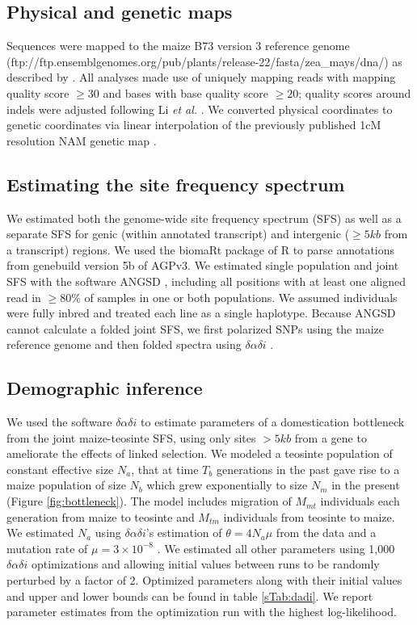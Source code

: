\documentclass{pnastwo}
\begin{document}
\begin{article}
\begin{materials}
\subsection{Physical and genetic maps}
Sequences were mapped to the maize B73 version 3 reference genome \cite{schnable2009} (ftp://ftp.ensemblgenomes.org/pub/plants/release-22/fasta/zea\_mays/dna/) as described by \cite{hapmap3}. All analyses made use of uniquely mapping reads with mapping quality score $\geq  30$ and bases with base quality score $\geq 20$; quality scores around indels were adjusted following Li \emph{et al.} \cite{li2011statistical}.
We converted physical coordinates to genetic coordinates via linear interpolation of the previously published 1cM resolution NAM genetic map \cite{glaubitz2014}. 

\subsection{Estimating the site frequency spectrum}
We estimated both the genome-wide site frequency spectrum (SFS) as well as a separate SFS for genic (within annotated transcript) and intergenic ($\geq 5kb$ from a transcript) regions. 
We used the biomaRt package \cite{durinck2009,durinck2005} of R \cite{R2014} to parse annotations from genebuild version 5b of AGPv3. 
We estimated single population and joint SFS with the software ANGSD \cite{korneliussen2014}, including all positions with at least one aligned read in $\geq 80\%$ of samples in one or both populations.
We assumed individuals were fully inbred and treated each line as a single haplotype. Because ANGSD cannot calculate a folded joint SFS, we first polarized SNPs using the maize reference genome and then folded spectra using $\delta\alpha\delta{i}$ \cite{gutenkunst2009}.

\subsection{Demographic inference}
We used the software $\delta\alpha\delta{i}$ \cite{gutenkunst2009} to estimate parameters of a domestication bottleneck from the joint maize-teosinte SFS, using only sites $>5 kb$ from a gene to ameliorate the effects of linked selection.
We modeled a teosinte population of constant effective size $N_a$, that at time $T_b$ generations in the past gave rise to a maize population of size $N_b$ which grew exponentially to size $N_m$ in the present (Figure \ref{fig:bottleneck}).
The model includes migration of $M_{mt}$ individuals each generation from maize to teosinte and $M_{tm}$ individuals from teosinte to maize.  We estimated $N_a$ using $\delta\alpha\delta{i}$'s estimation of $\theta=4N_a\mu$ from the data and a mutation rate of $\mu = 3 \times 10^{-8}$ \cite{clark2005}. 
We estimated all other parameters using 1,000 $\delta\alpha\delta{i}$ optimizations and allowing initial values between runs to be randomly perturbed by a factor of 2.  
Optimized parameters along with their initial values and upper and lower bounds can be found in table \ref{sTab:dadi}. We report parameter estimates from the optimization run with the highest log-likelihood.


\end{materials}
\end{article}
\end{document}
